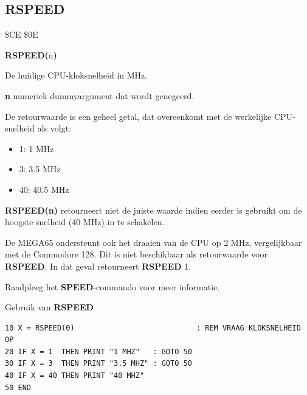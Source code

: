 \subsection{RSPEED}
\begin{description}[leftmargin=2cm,style=nextline]
\item [Token:]    \$CE \$0E

\item [Formaat:]   {\bf RSPEED(}n{\bf)}

\item [Retourneert:]  De huidige CPU-kloksnelheid in MHz.

                  {\bf n} numeriek dummyargument dat wordt genegeerd.

                  De retourwaarde is een geheel getal, dat overeenkomt met de werkelijke CPU-snelheid als volgt:

                  \begin{itemize}
                     \item 1: 1 MHz                     \item 3: 3.5 MHz                     \item 40: 40.5 MHz
                  \end{itemize}

\item [Opmerkingen:]  {\bf RSPEED(n)} retourneert niet de juiste waarde indien eerder  is gebruikt om de hoogste snelheid (40 MHz) in te schakelen.

                  De MEGA65 ondersteunt ook het draaien van de CPU op 2 MHz, vergelijkbaar met de Commodore 128. Dit is niet beschikbaar als retourwaarde voor {\bf RSPEED}. In dat geval retourneert {\bf RSPEED} 1.

                  Raadpleeg het {\bf SPEED}-commando voor meer informatie.

\item [Voorbeeld:]  Gebruik van {\bf RSPEED}

\begin{tcolorbox}[colback=black,coltext=white]
\verbatimfont{\codefont}
\begin{verbatim}
10 X = RSPEED(0)                            : REM VRAAG KLOKSNELHEID OP
20 IF X = 1  THEN PRINT "1 MHZ"   : GOTO 50
30 IF X = 3  THEN PRINT "3.5 MHZ" : GOTO 50
40 IF X = 40 THEN PRINT "40 MHZ"
50 END
\end{verbatim}
\end{tcolorbox}
\end{description}

